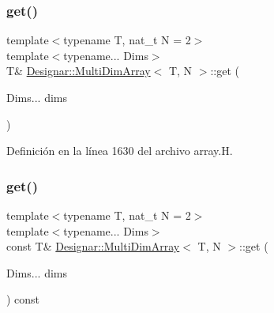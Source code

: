 \mbox{\label{class_designar_1_1_multi_dim_array_a27a85daef556fb6cdb3f0c0b0d16e4d0}} 
\subsubsection{\texorpdfstring{get()}{get()}\hspace{0.1cm}{\footnotesize\ttfamily [1/2]}}
{\footnotesize\ttfamily template$<$typename T, nat\+\_\+t N = 2$>$ \\
template$<$typename... Dims$>$ \\
T\& \hyperlink{class_designar_1_1_multi_dim_array}{Designar\+::\+Multi\+Dim\+Array}$<$ T, N $>$\+::get (\begin{DoxyParamCaption}\item[{Dims...}]{dims }\end{DoxyParamCaption})\hspace{0.3cm}{\ttfamily [inline]}}



Definición en la línea 1630 del archivo array.\+H.

\mbox{\label{class_designar_1_1_multi_dim_array_a36ba716b359942501b9cd6d96562e774}} 
\subsubsection{\texorpdfstring{get()}{get()}\hspace{0.1cm}{\footnotesize\ttfamily [2/2]}}
{\footnotesize\ttfamily template$<$typename T, nat\+\_\+t N = 2$>$ \\
template$<$typename... Dims$>$ \\
const T\& \hyperlink{class_designar_1_1_multi_dim_array}{Designar\+::\+Multi\+Dim\+Array}$<$ T, N $>$\+::get (\begin{DoxyParamCaption}\item[{Dims...}]{dims }\end{DoxyParamCaption}) const\hspace{0.3cm}{\ttfamily [inline]}}



